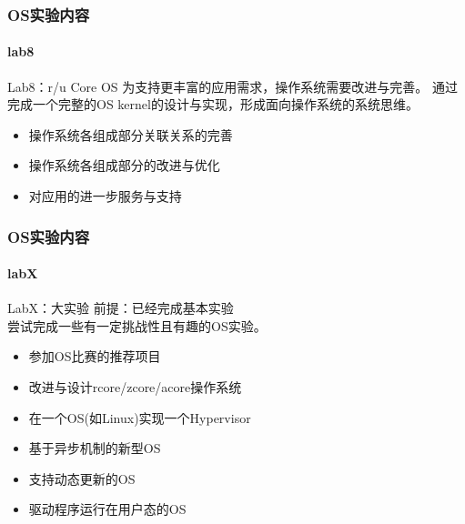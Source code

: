 \begin{frame}
\frametitle{OS实验内容}
\framesubtitle{lab8}

\begin{block}{Lab8：r/u Core OS}
为支持更丰富的应用需求，操作系统需要改进与完善。
通过完成一个完整的OS kernel的设计与实现，形成面向操作系统的系统思维。
\end{block}

\begin{itemize}
    \item 操作系统各组成部分关联关系的完善
    \item 操作系统各组成部分的改进与优化
    \item 对应用的进一步服务与支持
\end{itemize}

\end{frame}


\begin{frame}[plain]
\frametitle{OS实验内容}
\framesubtitle{labX}

\begin{block}{LabX：大实验}
前提：已经完成基本实验 \\
尝试完成一些有一定挑战性且有趣的OS实验。
\end{block}

\begin{itemize}
    \item 参加OS比赛的推荐项目
    \item 改进与设计rcore/zcore/acore操作系统
    \item 在一个OS(如Linux)实现一个Hypervisor
    \item 基于异步机制的新型OS
    \item 支持动态更新的OS
    \item 驱动程序运行在用户态的OS
\end{itemize}

\end{frame}


